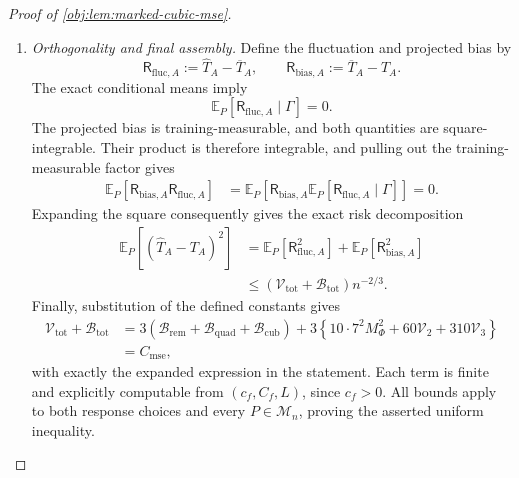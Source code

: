 \begin{proof}[Proof of \cref{obj:lem:marked-cubic-mse}]
\begin{enumerate}
\item \textit{Orthogonality and final assembly.}
Define the fluctuation and projected bias by
\[
\mathsf R_{\mathrm{fluc},A}:=\widehat T_A-\overline T_A,
\qquad
\mathsf R_{\mathrm{bias},A}:=\overline T_A-T_A.
\]
The exact conditional means imply
\[
\mathbb E_P[\mathsf R_{\mathrm{fluc},A}\mid\Gamma]=0.
\]
The projected bias is training-measurable, and both quantities are square-integrable. Their product is therefore integrable, and pulling out the training-measurable factor gives
\[
\begin{aligned}
\mathbb E_P[
\mathsf R_{\mathrm{bias},A}\mathsf R_{\mathrm{fluc},A}]
&=
\mathbb E_P\!\left[
\mathsf R_{\mathrm{bias},A}
\mathbb E_P[\mathsf R_{\mathrm{fluc},A}\mid\Gamma]
\right]
=0.
\end{aligned}
\]
Expanding the square consequently gives the exact risk decomposition
\[
\begin{aligned}
\mathbb E_P[(\widehat T_A-T_A)^2]
&=
\mathbb E_P[\mathsf R_{\mathrm{fluc},A}^2]
+\mathbb E_P[\mathsf R_{\mathrm{bias},A}^2]\\
&\le
(\mathcal V_{\mathrm{tot}}+\mathcal B_{\mathrm{tot}})n^{-2/3}.
\end{aligned}
\]
Finally, substitution of the defined constants gives
\[
\begin{aligned}
\mathcal V_{\mathrm{tot}}+\mathcal B_{\mathrm{tot}}
&=
3\left(
\mathcal B_{\mathrm{rem}}
+\mathcal B_{\mathrm{quad}}
+\mathcal B_{\mathrm{cub}}
\right)
+3\left\{
10\cdot7^2M_\Phi^2
+60\mathcal V_2+310\mathcal V_3
\right\}\\
&=C_{\mathrm{mse}},
\end{aligned}
\]
with exactly the expanded expression in the statement. Each term is finite and explicitly computable from \((c_f,C_f,L)\), since \(c_f>0\). All bounds apply to both response choices and every \(P\in\mathcal M_n\), proving the asserted uniform inequality.
\end{enumerate}
\end{proof}
